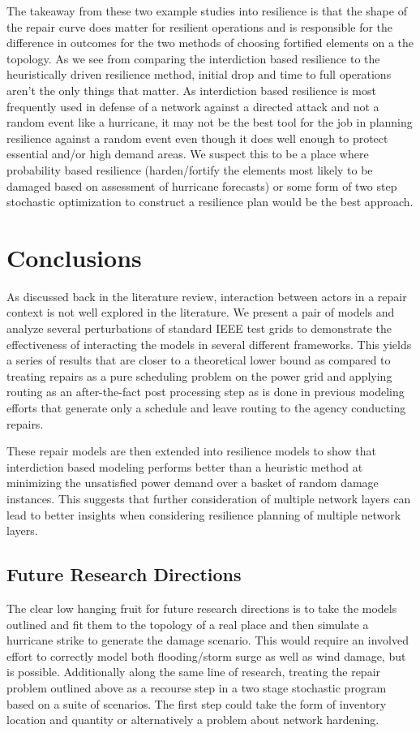 \documentclass{article}
\begin{document}
The takeaway from these two example studies into resilience is that the shape of the repair curve does matter for resilient operations and is responsible for the difference in outcomes for the two methods of choosing fortified elements on a the topology. As we see from comparing the interdiction based resilience to the heuristically driven resilience method, initial drop and time to full operations aren't the only things that matter. As interdiction based resilience is most frequently used in defense of a network against a directed attack and not a random event like a hurricane, it may not be the best tool for the job in planning resilience against a random event even though it does well enough to protect essential and/or high demand areas. We suspect this to be a place where probability based resilience (harden/fortify the elements most likely to be damaged based on assessment of hurricane forecasts) or some form of two step stochastic optimization to construct a resilience plan would be the best approach. 

	\section{Conclusions}
	
	As discussed back in the literature review, interaction between actors in a repair context is not well explored in the literature. We present a pair of models and analyze several perturbations of standard IEEE test grids to demonstrate the effectiveness of interacting the models in several different frameworks. This yields a series of results that are closer to a theoretical lower bound as compared to treating repairs as a pure scheduling problem on the power grid and applying routing as an after-the-fact post processing step as is done in previous modeling efforts that generate only a schedule and leave routing to the agency conducting repairs.
	
	These repair models are then extended into resilience models to show that interdiction based modeling performs better than a heuristic method at minimizing the unsatisfied power demand over a basket of random damage instances. This suggests that further consideration of multiple network layers can lead to better insights when considering resilience planning of multiple network layers.
	

	\subsection{Future Research Directions}
	The clear low hanging fruit for future research directions is to take the models outlined and fit them to the topology of a real place and then simulate a hurricane strike to generate the damage scenario. This would require an involved effort to correctly model both flooding/storm surge as well as wind damage, but is possible. Additionally along the same line of research, treating the repair problem outlined above as a recourse step in a two stage stochastic program based on a suite of scenarios. The first step could take the form of inventory location and quantity or alternatively a problem about network hardening.
	
\end{document}
